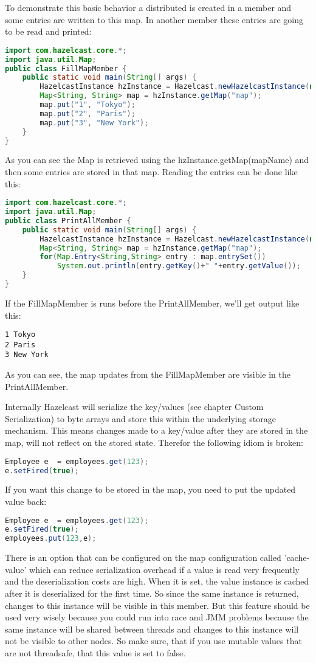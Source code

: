 To demonstrate this basic behavior a distributed is created in a member and some entries are written to this map. In another member these entries are going to be read and printed:
\begin{lstlisting}[language=java]
import com.hazelcast.core.*;
import java.util.Map;
public class FillMapMember {
    public static void main(String[] args) {
        HazelcastInstance hzInstance = Hazelcast.newHazelcastInstance(null);
        Map<String, String> map = hzInstance.getMap("map");
        map.put("1", "Tokyo");
        map.put("2", "Paris");
        map.put("3", "New York");
    }
}
\end{lstlisting}
As you can see the Map is retrieved using the hzInstance.getMap(mapName) and then some entries are stored in that map. Reading the entries can be done like this:
\begin{lstlisting}[language=java]
import com.hazelcast.core.*;
import java.util.Map;
public class PrintAllMember {
    public static void main(String[] args) {
        HazelcastInstance hzInstance = Hazelcast.newHazelcastInstance(null);
        Map<String, String> map = hzInstance.getMap("map");
        for(Map.Entry<String,String> entry : map.entrySet())
            System.out.println(entry.getKey()+" "+entry.getValue());
    }
}
\end{lstlisting}
If the FillMapMember is runs before the PrintAllMember, we'll get output like this:
\begin{lstlisting}
1 Tokyo
2 Paris
3 New York
\end{lstlisting}
As you can see, the map updates from the FillMapMember are visible in the PrintAllMember.

Internally Hazelcast will serialize the key/values (see chapter Custom Serialization) to byte arrays and store this within the underlying storage mechanism. This means changes made to a key/value after they are stored in the map, will not reflect on the stored state. Therefor the following idiom is broken:
\begin{lstlisting}[language=java]
Employee e  = employees.get(123);
e.setFired(true);
\end{lstlisting}
If you want this change to be stored in the map, you need to put the updated value back:
\begin{lstlisting}[language=java]
Employee e  = employees.get(123);
e.setFired(true);
employees.put(123,e);
\end{lstlisting}

There is an option that can be configured on the map configuration called 'cache-value' which can reduce serialization overhead if a value is read very frequently and the deserialization costs are high. When it is set, the value instance is cached after it is deserialized for the first time. So since the same instance is returned, changes to this instance will be visible in this member. But this feature should be used very wisely because you could run into race and JMM problems because the same instance will be shared between threads and changes to this instance will not be visible to other nodes. So make sure, that if you use mutable values that are not threadsafe, that this value is set to false. 

